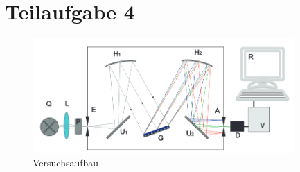 

\section{Teilaufgabe 4}


\begin{figure}[h]
    \begin{center}
        \includegraphics[width=10cm]{Bilder/SP1.PNG}
    \end{center}
    \caption{Versuchsaufbau}
   \end{figure}
